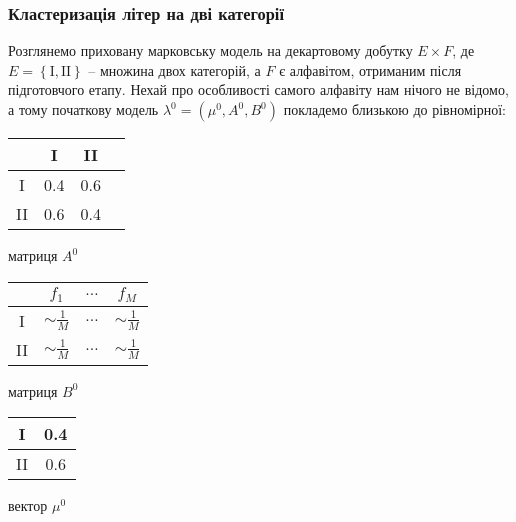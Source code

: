 \newpage
\subsubsection{Кластеризація літер на дві категорії}
\label{section: II classes}

Розглянемо приховану марковську модель на декартовому добутку $E\times F$, де $E=\left\{\text{I},\text{II}\right\}$ -- множина двох категорій, а $F$ є алфавітом, отриманим після підготовчого етапу. Нехай про особливості самого алфавіту нам нічого не відомо, а тому початкову модель $\lambda^0=(\mu^0,A^0,B^0)$ покладемо близькою до рівномірної:

\vspace{0.4cm}
\begin{table}[H]
    \begin{minipage}[H]{0.35\linewidth}
        \begin{center}
            \begin{tabular}{c|ccc}
                & I & II \\
                \hline
                I & 0.4 & 0.6 \\
                II & 0.6 & 0.4 \\
            \end{tabular}
        \end{center} \centering матриця $A^0$
    \end{minipage}
    \hfill
    \begin{minipage}[H]{0.35\linewidth}
        \begin{center}
            \begin{tabular}{c|ccc}
                & $f_1$ & $\ldots$ & $f_M$ \\
                \hline
                I & $\sim \frac{1}{M}$ & $\ldots$ & $\sim \frac{1}{M}$ \\
                II & $\sim \frac{1}{M}$ & $\ldots$ & $\sim \frac{1}{M}$ \\
            \end{tabular}
        \end{center} \centering матриця $B^0$
    \end{minipage}
    \hfill
    \begin{minipage}[H]{0.25\linewidth}
        \begin{center}
            \begin{tabular}{c|c}
                I & 0.4 \\
                \hline
                II & 0.6 \\
            \end{tabular}
        \end{center} \centering вектор $\mu^0$
    \end{minipage}
\end{table}

